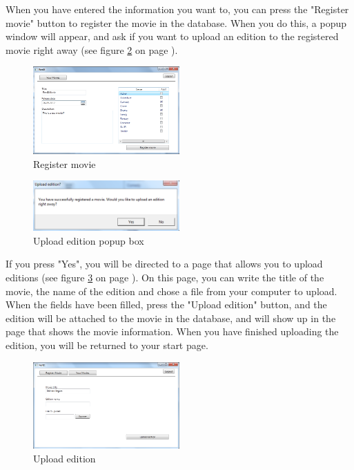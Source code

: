 When you have entered the information you want to, you can press the "Register movie" button to register the movie in the database. When you do this, a popup window will appear, and ask if you want to upload an edition to the registered movie right away (see figure \ref{fig:Manual_Client_Navigation_Upload_Popup} on page \pageref{fig:Manual_Client_Navigation_Upload_Popup}).

\begin{figure}[h!]  
  \centering
\includegraphics[width=0.5\textwidth]{Parts/Images/Manual/CPRegistermovie}
\caption{Register movie}
\label{fig:Manual_Client_Navigation_Upload_Register}
\end{figure}

\begin{figure}[h!]  
  \centering
\includegraphics[width=0.5\textwidth]{Parts/Images/Manual/RegisterPopup}
\caption{Upload edition popup box}
\label{fig:Manual_Client_Navigation_Upload_Popup}
\end{figure}

If you press "Yes", you will be directed to a page that allows you to upload editions (see figure \ref{fig:Manual_Client_Navigation_Upload_Edition} on page \pageref{fig:Manual_Client_Navigation_Upload_Edition}). On this page, you can write the title of the movie, the name of the edition and chose a file from your computer to upload. When the fields have been filled, press the "Upload edition" button, and the edition will be attached to the movie in the database, and will show up in the page that shows the movie information. When you have finished uploading the edition, you will be returned to your start page.

\begin{figure}[h!]  
  \centering
\includegraphics[width=0.5\textwidth]{Parts/Images/Manual/CPUploadEdition}
\caption{Upload edition}
\label{fig:Manual_Client_Navigation_Upload_Edition}
\end{figure}

